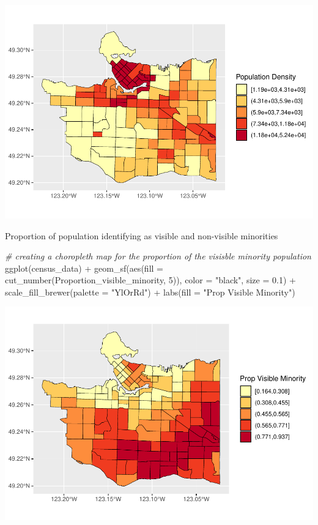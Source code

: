 \documentclass[
]{article}
\newenvironment{Shaded}{\begin{snugshade}}{\end{snugshade}}
\newcommand{\AttributeTok}[1]{\textcolor[rgb]{0.77,0.63,0.00}{#1}}
\newcommand{\CommentTok}[1]{\textcolor[rgb]{0.56,0.35,0.01}{\textit{#1}}}
\newcommand{\DecValTok}[1]{\textcolor[rgb]{0.00,0.00,0.81}{#1}}
\newcommand{\FloatTok}[1]{\textcolor[rgb]{0.00,0.00,0.81}{#1}}
\newcommand{\FunctionTok}[1]{\textcolor[rgb]{0.00,0.00,0.00}{#1}}
\newcommand{\NormalTok}[1]{#1}
\newcommand{\SpecialCharTok}[1]{\textcolor[rgb]{0.00,0.00,0.00}{#1}}
\newcommand{\StringTok}[1]{\textcolor[rgb]{0.31,0.60,0.02}{#1}}
\begin{document}
\begin{center}\includegraphics[width=0.8\linewidth]{4GA3Markdown_files/figure-latex/unnamed-chunk-23-1} \end{center}

Proportion of population identifying as visible and non-visible
minorities

\begin{Shaded}
\begin{Highlighting}[]
\CommentTok{\# creating a choropleth map for the proportion of the visisble minority population}
\FunctionTok{ggplot}\NormalTok{(census\_data) }\SpecialCharTok{+}
\FunctionTok{geom\_sf}\NormalTok{(}\FunctionTok{aes}\NormalTok{(}\AttributeTok{fill =} \FunctionTok{cut\_number}\NormalTok{(Proportion\_visible\_minority, }\DecValTok{5}\NormalTok{)),}
        \AttributeTok{color =} \StringTok{"black"}\NormalTok{,}
        \AttributeTok{size =} \FloatTok{0.1}\NormalTok{) }\SpecialCharTok{+}
\FunctionTok{scale\_fill\_brewer}\NormalTok{(}\AttributeTok{palette =} \StringTok{"YlOrRd"}\NormalTok{) }\SpecialCharTok{+}
\FunctionTok{labs}\NormalTok{(}\AttributeTok{fill =} \StringTok{"Prop Visible Minority"}\NormalTok{)}
\end{Highlighting}
\end{Shaded}

\begin{center}\includegraphics[width=0.8\linewidth]{4GA3Markdown_files/figure-latex/unnamed-chunk-24-1} \end{center}
\end{document}
